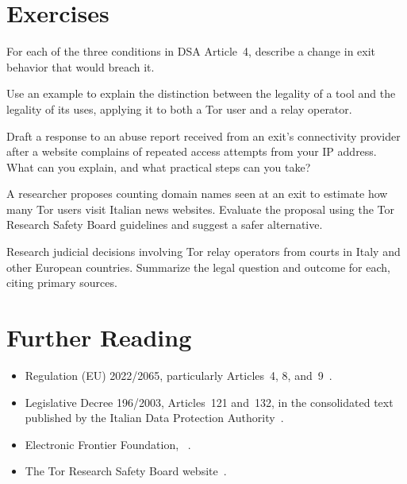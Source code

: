 \section*{Exercises}

\begin{esercizio}[1]\label{es:25-condizioni}
For each of the three conditions in DSA Article~4, describe a change in exit behavior that would breach it.
\end{esercizio}

\begin{esercizio}[1]\label{es:25-strumento}
Use an example to explain the distinction between the legality of a tool and the legality of its uses, applying it to both a Tor user and a relay operator.
\end{esercizio}

\begin{esercizio}[2]\label{es:25-segnalazione}
Draft a response to an abuse report received from an exit's connectivity provider after a website complains of repeated access attempts from your IP address. What can you explain, and what practical steps can you take?
\end{esercizio}

\begin{esercizio}[2]\label{es:25-esperimento}
A researcher proposes counting domain names seen at an exit to estimate how many Tor users visit Italian news websites. Evaluate the proposal using the Tor Research Safety Board guidelines and suggest a safer alternative.
\end{esercizio}

\begin{esercizio}[3]\label{es:25-ricerca}
Research judicial decisions involving Tor relay operators from courts in Italy and other European countries. Summarize the legal question and outcome for each, citing primary sources.
\end{esercizio}

\section*{Further Reading}
\begin{itemize}
  \item Regulation (EU) 2022/2065, particularly Articles~4, 8, and~9~\cite{dsa2022}.
  \item Legislative Decree 196/2003, Articles~121 and~132, in the consolidated text published by the Italian Data Protection Authority~\cite{codiceprivacy}.
  \item Electronic Frontier Foundation, ~\cite{efflegalfaq}.
  \item The Tor Research Safety Board website~\cite{trsb}.
\end{itemize}
